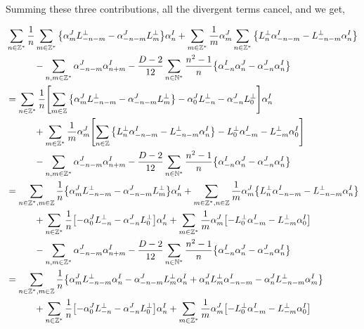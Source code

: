 Summing these three contributions, all the divergent terms cancel, and we get,

\begin{align*}
    &\sum\limits_{n\in\mathbb Z^\ast}\frac1n\sum\limits_{m\in\mathbb Z^\ast}\qty{\alpha^J_mL^\perp_{-n-m}-\alpha^J_{-n-m}L^\perp_m}\alpha^I_n+\sum\limits_{m\in\mathbb Z^\ast}\frac1m\alpha_m^J\sum\limits_{n\in\mathbb Z^\ast}\qty{L_n^\perp\alpha^I_{-n-m}-L^\perp_{-n-m}\alpha^I_n}\\
    &\quad\quad\quad-\sum\limits_{n,m\in\mathbb Z^\ast}\alpha_{-n-m}^J\alpha^I_{n+m}-\frac{D-2}{12}\sum\limits_{n\in\mathbb N^\ast}\frac{n^2-1}{n}\qty{\alpha^I_{-n}\alpha^J_n-\alpha^J_{-n}\alpha^I_n}\\
    &=\sum\limits_{n\in\mathbb Z^\ast}\frac1n\qty[\sum\limits_{m\in\mathbb Z}\qty{\alpha^J_mL^\perp_{-n-m}-\alpha^J_{-n-m}L^\perp_m}-\alpha_0^JL^\perp_{-n}-\alpha^J_{-n}L^\perp_0]\alpha^I_n\\
    &\quad\quad\quad+\sum\limits_{m\in\mathbb Z^\ast}\frac1m\alpha_m^J\qty[\sum\limits_{n\in\mathbb Z}\qty{L_n^\perp\alpha^I_{-n-m}-L^\perp_{-n-m}\alpha^I_n}-L^\perp_0\alpha^I_{-m}-L^\perp_{-m}\alpha^I_0]\\
    &\quad\quad\quad-\sum\limits_{n,m\in\mathbb Z^\ast}\alpha_{-n-m}^J\alpha^I_{n+m}-\frac{D-2}{12}\sum\limits_{n\in\mathbb N^\ast}\frac{n^2-1}{n}\qty{\alpha^I_{-n}\alpha^J_n-\alpha^J_{-n}\alpha^I_n}\\
    &=\sum\limits_{n\in\mathbb Z^\ast,m\in\mathbb Z}\frac1n\qty{\alpha^J_mL^\perp_{-n-m}-\alpha^J_{-n-m}L^\perp_m}\alpha^I_n+\sum\limits_{m\in\mathbb Z^\ast,n\in\mathbb Z}\frac1m\alpha_m^J\qty{L_n^\perp\alpha^I_{-n-m}-L^\perp_{-n-m}\alpha^I_n}\\
    &\quad\quad\quad+\sum\limits_{n\in\mathbb Z^\ast}\frac1n\qty[-\alpha_0^JL^\perp_{-n}-\alpha^J_{-n}L^\perp_0]\alpha_n^I+\sum\limits_{m\in\mathbb Z^\ast}\frac1m\alpha_m^J\qty[-L^\perp_0\alpha^I_{-m}-L^\perp_{-m}\alpha^I_0]\\
    &\quad\quad\quad-\sum\limits_{n,m\in\mathbb Z^\ast}\alpha_{-n-m}^J\alpha^I_{n+m}-\frac{D-2}{12}\sum\limits_{n\in\mathbb N^\ast}\frac{n^2-1}{n}\qty{\alpha^I_{-n}\alpha^J_n-\alpha^J_{-n}\alpha^I_n}\\
    &=\sum\limits_{n\in\mathbb Z^\ast,m\in\mathbb Z}\frac1n\qty{\alpha^J_mL^\perp_{-n-m}\alpha^I_n-\alpha^J_{-n-m}L^\perp_m\alpha^I_n+\alpha_n^JL_m^\perp\alpha^I_{-n-m}-\alpha_n^JL^\perp_{-n-m}\alpha^I_m}\\
    &\quad\quad\quad+\sum\limits_{n\in\mathbb Z^\ast}\frac1n\qty[-\alpha_0^JL^\perp_{-n}-\alpha^J_{-n}L^\perp_0]\alpha_n^I+\sum\limits_{m\in\mathbb Z^\ast}\frac1m\alpha_m^J\qty[-L^\perp_0\alpha^I_{-m}-L^\perp_{-m}\alpha^I_0]\\

\end{align*}
